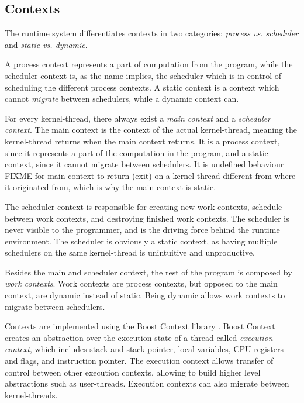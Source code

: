\FloatBarrier
\subsection{Contexts}
\label{subsec:contexts}

The runtime system differentiates contexts in two categories: \textit{process vs. scheduler} and \textit{static vs. dynamic}.

A process context represents a part of computation from the program, while the scheduler context is, as the name implies, the scheduler which is in control of scheduling the different process contexts. A static context is a context which cannot \textit{migrate} between schedulers, while a dynamic context can.

For every kernel\hyp{}thread, there always exist a \textit{main context} and a \textit{scheduler context}. The main context is the context of the actual kernel\hyp{}thread, meaning the kernel\hyp{}thread returns when the main context returns. It is a process context, since it represents a part of the computation in the program, and a static context, since it cannot migrate between schedulers. It is undefined behaviour FIXME for main context to return (exit) on a kernel\hyp{}thread different from where it originated from, which is why the main context is static.

The scheduler context is responsible for creating new work contexts, schedule between work contexts, and destroying finished work contexts. The scheduler is never visible to the programmer, and is the driving force behind the runtime environment. The scheduler is obviously a static context, as having multiple schedulers on the same kernel\hyp{}thread is unintuitive and unproductive.

Besides the main and scheduler context, the rest of the program is composed by \textit{work contexts}. Work contexts are process contexts, but opposed to the main context, are dynamic instead of static. Being dynamic allows work contexts to migrate between schedulers. 

Contexts are implemented using the Boost Context library \citep{kowalke2017boost}. Boost Context creates an abstraction over the execution state of a thread called \textit{execution context}, which includes stack and stack pointer, local variables, CPU registers and flags, and instruction pointer. The execution context allows transfer of control between other execution contexts, allowing to build higher level abstractions such as user\hyp{}threads. Execution contexts can also migrate between kernel\hyp{}threads.

